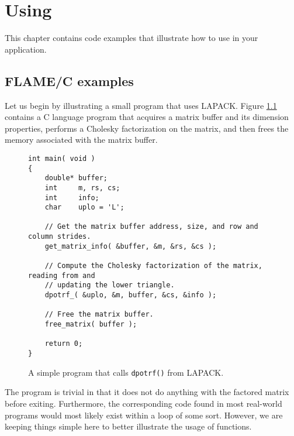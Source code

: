 \chapter{Using \libflame}
\label{chapter:using}

This chapter contains code examples that illustrate how to use \libflame in
your application.

\section{FLAME/C examples}
\label{sec:flamec-examples}

Let us begin by illustrating a small program that uses LAPACK.
Figure \ref{fig:fla-chol-orig} contains a C language program that acquires a
matrix buffer and its dimension properties, performs a Cholesky factorization
on the matrix, and then frees the memory associated with the matrix buffer.

\begin{figure}[h]
\begin{Verbatim}[frame=single,framesep=2.5mm,xleftmargin=5mm,fontsize=\footnotesize]
int main( void )
{
    double* buffer;
    int     m, rs, cs;
    int     info;
    char    uplo = 'L';

    // Get the matrix buffer address, size, and row and column strides.
    get_matrix_info( &buffer, &m, &rs, &cs );

    // Compute the Cholesky factorization of the matrix, reading from and
    // updating the lower triangle.
    dpotrf_( &uplo, &m, buffer, &cs, &info );
  
    // Free the matrix buffer.
    free_matrix( buffer );

    return 0;
}
\end{Verbatim}
\caption{
A simple program that calls {\tt dpotrf()} from LAPACK.
}
\label{fig:fla-chol-orig}
\end{figure}

\noindent
The program is trivial in that it does not do anything with the factored
matrix before exiting.
Furthermore, the corresponding code found in most real-world programs would
most likely exist within a loop of some sort.
However, we are keeping things simple here to better illustrate the usage
of \libflame functions.

